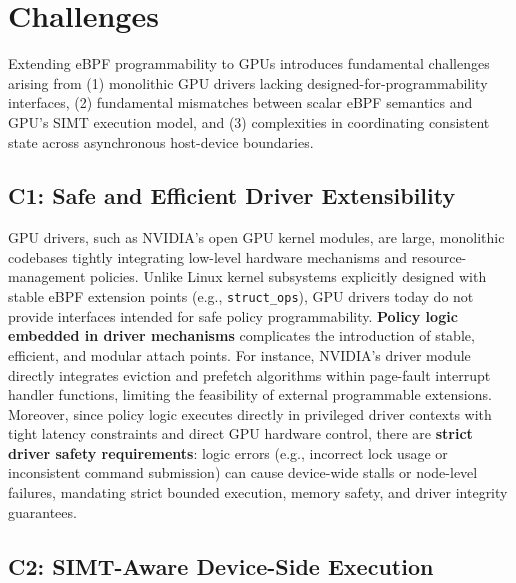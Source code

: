 \section{Challenges}
\label{sec:challenges}

Extending eBPF programmability to GPUs introduces fundamental challenges arising from (1) monolithic GPU drivers lacking designed-for-programmability interfaces, (2) fundamental mismatches between scalar eBPF semantics and GPU's SIMT execution model, and (3) complexities in coordinating consistent state across asynchronous host-device boundaries.

\subsection{C1: Safe and Efficient Driver Extensibility}

GPU drivers, such as NVIDIA's open GPU kernel modules, are large, monolithic codebases tightly integrating low-level hardware mechanisms and resource-management policies. Unlike Linux kernel subsystems explicitly designed with stable eBPF extension points (e.g., \texttt{struct\_ops}), GPU drivers today do not provide interfaces intended for safe policy programmability. \textbf{Policy logic embedded in driver mechanisms} complicates the introduction of stable, efficient, and modular attach points. For instance, NVIDIA's driver module directly integrates eviction and prefetch algorithms within page-fault interrupt handler functions, limiting the feasibility of external programmable extensions. Moreover, since policy logic executes directly in privileged driver contexts with tight latency constraints and direct GPU hardware control, there are \textbf{strict driver safety requirements}: logic errors (e.g., incorrect lock usage or inconsistent command submission) can cause device-wide stalls or node-level failures, mandating strict bounded execution, memory safety, and driver integrity guarantees.

\subsection{C2: SIMT-Aware Device-Side Execution}

